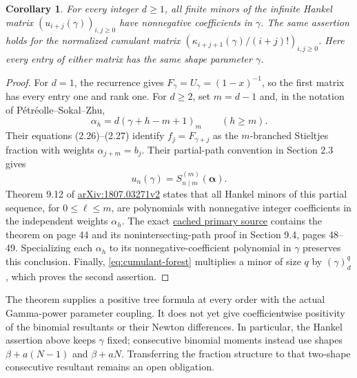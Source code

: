 \documentclass[11pt]{article}
\newtheorem{corollary}[theorem]{Corollary}
\begin{document}
\begin{corollary}\label{cor:cumulant-hankel}
For every integer $d\ge1$, all finite minors of the infinite Hankel
matrix $(u_{i+j}(\gamma))_{i,j\ge0}$ have nonnegative coefficients in
$\gamma$. The same assertion holds for the normalized cumulant
matrix $(\kappa_{i+j+1}(\gamma)/(i+j)!)_{i,j\ge0}$.
Here every entry of either matrix has the same shape parameter
$\gamma$.
\end{corollary}
\begin{proof}
For $d=1$, the recurrence gives $F_\gamma=U_\gamma=(1-x)^{-1}$,
so the first matrix has every entry one and rank one.
For $d\ge2$, set $m=d-1$ and, in the notation of
P\'etr\'eolle--Sokal--Zhu,
\[
 \alpha_h=d(\gamma+h-m+1)_m\qquad(h\ge m).
\]
Their equations (2.26)--(2.27) identify
$f_j=F_{\gamma+j}$ as the $m$-branched Stieltjes fraction with
weights $\alpha_{j+m}=b_j$. Their partial-path convention in
Section 2.3 gives
\[
 u_n(\gamma)=S^{(m)}_{n\mid m}(\boldsymbol\alpha).
\]
Theorem 9.12 of
\href{https://arxiv.org/pdf/1807.03271v2}{arXiv:1807.03271v2}
states that all Hankel minors of this partial sequence, for
$0\le\ell\le m$, are polynomials with nonnegative integer
coefficients in the independent weights $\alpha_h$.
The exact \href{sources/petreolle-sokal-zhu-1807.03271v2.pdf}{cached primary source}
contains the theorem on page 44 and its nonintersecting-path proof
in Section 9.4, pages 48--49. Specializing each $\alpha_h$ to its
nonnegative-coefficient polynomial in $\gamma$ preserves this
conclusion. Finally, \eqref{eq:cumulant-forest} multiplies a minor
of size $q$ by $(\gamma)_d^q$, which proves the second assertion.
\end{proof}

The theorem supplies a positive tree formula at every order with
the actual Gamma-power parameter coupling. It does not yet give
coefficientwise positivity of the binomial resultants or their
Newton differences. In particular, the Hankel assertion above keeps
$\gamma$ fixed; consecutive binomial moments instead use shapes
$\beta+a(N-1)$ and $\beta+aN$. Transferring the fraction structure
to that two-shape consecutive resultant remains an open obligation.
\end{document}
